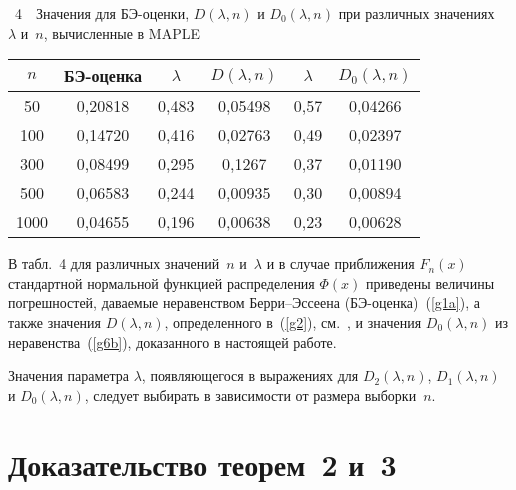 \begin{multicols}{2}
\noindent
\begin{center}
\parbox{80mm}{{\tablename~4}\ \ \small{Значения для БЭ-оценки, 
$D(\lambda,n)$ и $D_0(\lambda,n)$ при различных значениях~ $\lambda$ и~$n$, 
вычисленные в    MAPLE}}

\vspace*{2ex}
\tabcolsep=4.5pt
{\small 
\begin{tabular}{|c|c||c|c||c|c|}
\hline
$n$    &БЭ-оценка & $\lambda$ &   $D(\lambda,n)$ & $\lambda$ & $D_0(\lambda,n)$\\
\hline
\hphantom{9}50   & 0,20818 & 0,483 & 0,05498 & 0,57 & 0,04266\\
100  & 0,14720 & 0,416 & 0,02763 & 0,49 & 0,02397\\
300 & 0,08499 & 0,295 & 0,1267\hphantom{9} & 0,37 & 0,01190\\
500 & 0,06583 & 0,244 & 0,00935 & 0,30 & 0,00894\\
1000\hphantom{9} & 0,04655 & 0,196 & 0,00638 & 0,23 & 0,00628\\
\hline 
\end{tabular}
}
\end{center}
\vspace*{9pt}

\smallskip
\addtocounter{table}{1}

В табл.~4 для различных значений~$n$ и~$\lambda$ и в случае приближения $F_n(x)$  
стандартной нормальной функцией распределения   $\Phi(x)$ приведены  величины 
погрешностей, даваемые неравенством Берри--Эссеена (БЭ-оцен\-ка)~(\ref{g1a}), 
а также значения $D(\lambda,n)$, определенного в~(\ref{g2}), см.~\cite{5-cr}, 
и значения $D_0(\lambda,n)$ из неравенства~(\ref{g6b}), доказанного в настоящей работе.


Значения параметра  $\lambda$, появляющегося в выражениях для   $D_2(\lambda, n)$, 
$D_1(\lambda, n)$ и $D_0(\lambda, n)$, следует выбирать в зависимости от размера выборки~$n$.

\section{Доказательство теорем~2 и~3}


\end{multicols}
